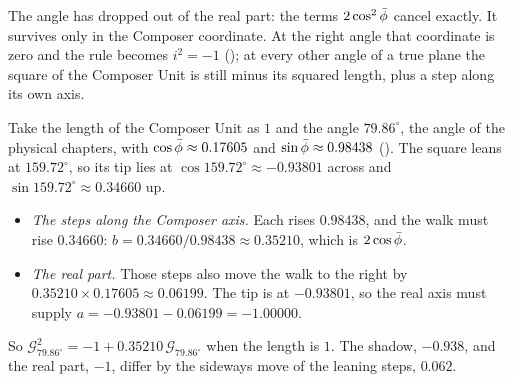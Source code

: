 The angle has dropped out of the real part: the terms $2\cos^2\bar{\phi}$ cancel exactly. It survives only in the Composer coordinate. At the right angle that coordinate is zero and the rule becomes $i^2 = -1$ (); at every other angle of a true plane the square of the Composer Unit is still minus its squared length, plus a step along its own axis.


\begin{workedexample}
Take the length of the Composer Unit as $1$ and the angle $79.86^\circ$, the angle of the physical chapters, with $\cos\bar{\phi} \approx 0.17605$ and $\sin\bar{\phi} \approx 0.98438$ (). The square leans at $159.72^\circ$, so its tip lies at $\cos 159.72^\circ \approx -0.93801$ across and $\sin 159.72^\circ \approx 0.34660$ up.
\begin{itemize}
  \item \emph{The steps along the Composer axis.} Each rises $0.98438$, and the walk must rise $0.34660$: $b = 0.34660/0.98438 \approx 0.35210$, which is $2\cos\bar{\phi}$.
  \item \emph{The real part.} Those steps also move the walk to the right by $0.35210 \times 0.17605 \approx 0.06199$. The tip is at $-0.93801$, so the real axis must supply $a = -0.93801 - 0.06199 = -1.00000$.
\end{itemize}
So $\mathcal{G}_{79.86^\circ}^2 = -1 + 0.35210\,\mathcal{G}_{79.86^\circ}$ when the length is $1$. The shadow, $-0.938$, and the real part, $-1$, differ by the sideways move of the leaning steps, $0.062$.
\end{workedexample}

